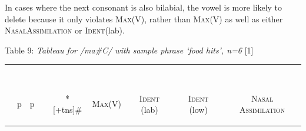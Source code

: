\documentclass[output=paper,
modfonts
]{langscibook}
\begin{document}
In cases where the next consonant is also bilabial, the vowel is more likely to delete because it only violates \textsc{Max}(V), rather than \textsc{Max}(V) as well as either \textsc{NasalAssimilation} or \textsc{Ident}(lab). 

\begin{center}Table 9: \textit{Tableau for /ma\#C/ with sample phrase ‘food hits’, n=6}
\renewcommand*\arraystretch{1.2}
\vspace{1.0cm} \scalebox{1}[1]{}{\begin{tabular}[t]{|l||c|c|c|c|c|c|c|c|} 
\hline
& & & & & & & & \\
 & & & & & & & & \\
  & & & & & & & &\\
 & & & & & & & &  \\
  & & & & & & & &\\
 & & & & & & & &  \\
{\textipa{}} & \hspace*{0.1cm} p  \hspace*{0.2cm} & \hspace*{0.1cm} p  \hspace*{0.2cm} & \hspace*{0.1cm} \begin{rotate}{45} \end{rotate} \hspace*{0.2cm} & \hspace*{0.1cm} \begin{rotate}{90} *[+tns]\# \end{rotate} \hspace*{0.2cm} & \hspace*{0.1cm} \begin{rotate}{90} \textsc{Max}(V) \end{rotate} \hspace*{0.2cm} & \hspace*{0.1cm} \begin{rotate}{90} \textsc{Ident} (lab) \end{rotate} \hspace*{0.2cm} & \hspace*{0.1cm} \begin{rotate}{90} \textsc{Ident} (low) \end{rotate} \hspace{0.2cm} & \hspace*{0.1cm} \begin{rotate}{90} \textsc{Nasal Assimilation} \end{rotate} \hspace*{0.2cm}\\[.5ex]


\end{tabular}}
\end{center}
\end{document}
